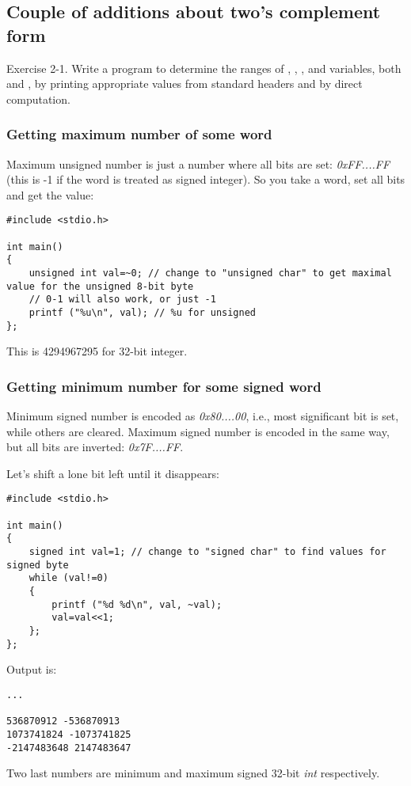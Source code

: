 \subsection{Couple of additions about two's complement form}

\epigraph{Exercise 2-1. Write a program to determine the ranges of , , , and 
variables, both  and , by printing appropriate values from standard headers
and by direct computation.}{\KRBook}

\subsubsection{Getting maximum number of some \gls{word}}

Maximum unsigned number is just a number where all bits are set: \emph{0xFF....FF}
(this is -1 if the \gls{word} is treated as signed integer).
So you take a \gls{word}, set all bits and get the value:

\begin{lstlisting}[style=customc]
#include <stdio.h>

int main()
{
	unsigned int val=~0; // change to "unsigned char" to get maximal value for the unsigned 8-bit byte
	// 0-1 will also work, or just -1
	printf ("%u\n", val); // %u for unsigned
};
\end{lstlisting}

This is 4294967295 for 32-bit integer.

\subsubsection{Getting minimum number for some signed \gls{word}}

Minimum signed number is encoded as \emph{0x80....00}, i.e., most significant bit is set, while others are cleared.
Maximum signed number is encoded in the same way, but all bits are inverted: \emph{0x7F....FF}.

Let's shift a lone bit left until it disappears:

\begin{lstlisting}[style=customc]
#include <stdio.h>

int main()
{
	signed int val=1; // change to "signed char" to find values for signed byte
	while (val!=0)
	{
		printf ("%d %d\n", val, ~val);
		val=val<<1;
	};
};
\end{lstlisting}

Output is:

\begin{lstlisting}
...

536870912 -536870913
1073741824 -1073741825
-2147483648 2147483647
\end{lstlisting}

Two last numbers are minimum and maximum signed 32-bit \emph{int} respectively.


